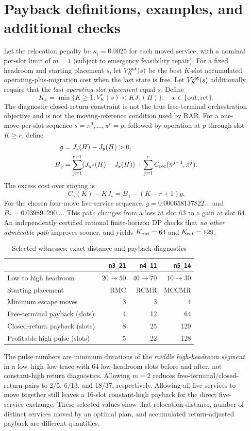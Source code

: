 \documentclass[10pt,a4paper]{article}
\begin{document}
\section{Payback definitions, examples, and additional checks}\label{sec:payback}
Let the relocation penalty be $\kappa_i=0.0025$ for each moved service, with a nominal per-slot limit of $m=1$ (subject to emergency feasibility repair). For a fixed headroom and starting placement $s$, let $V_K^{\rm out}(s)$ be the best $K$-slot accumulated operating-plus-migration cost when the last state is free. Let $V_K^{\rm ret}(s)$ additionally require that the \emph{last operating-slot placement} equal $s$. Define
\[K_x=\min\{K\ge1:V_K^x(s)<KJ_s(H)\},\quad x\in\{\mathrm{out},\mathrm{ret}\}.\]
The diagnostic closed-return constraint is not the true free-terminal orchestration objective and is not the moving-reference condition used by RAR. For a one-move-per-slot sequence $s=\pi^0,\ldots,\pi^r=p$, followed by operation at $p$ through slot $K\ge r$, define
\begin{align*}
g&=J_s(H)-J_p(H)>0,\\
B_\gamma&=\sum_{j=1}^{r-1}(J_{\pi^j}(H)-J_s(H))
+\sum_{j=1}^r C_{\rm rec}(\pi^{j-1},\pi^j).
\end{align*}
The excess cost over staying is
\[C_\gamma(K)-KJ_s=B_\gamma-(K-r+1)g.\]
For the chosen four-move five-service sequence, $g=0.000658137822\ldots$ and $B_\gamma=0.039891290\ldots$. This path changes from a loss at slot 63 to a gain at slot 64. An independently certified rational finite-horizon DP checks that \emph{no other admissible path} improves sooner, and yields $K_{\rm out}=64$ and $K_{\rm ret}=129$.
\begin{table}[h]\centering\small
\caption{Selected witnesses; exact distance and payback diagnostics}\label{tab:paybacks}
\begin{tabular}{lrrr}\toprule
& \texttt{n3\_21} & \texttt{n4\_11} & \texttt{n5\_14}\\\midrule
Low to high headroom & $20\to50$ &$40\to70$ &$10\to30$\\
Starting placement &RMC&RCMR&MCCMR\\
Minimum escape moves &3&3&4\\
Free-terminal payback (slots) &4&12&64\\
Closed-return payback (slots) &8&25&129\\
Profitable high pulse (slots)&5&22&128\\\bottomrule
\end{tabular}\end{table}
The pulse numbers are minimum durations of the \emph{middle high-headroom segment} in a low--high--low trace with 64 low-headroom slots before and after, not constant-high return diagnostics. Allowing $m=2$ reduces free-terminal/closed-return pairs to $2/5$, $6/13$, and $18/37$, respectively. Allowing all five services to move together still leaves a 16-slot constant-high payback for the direct five-service exchange. These selected values show that relocation distance, number of distinct services moved by an optimal plan, and accumulated return-adjusted payback are different quantities.
\end{document}
